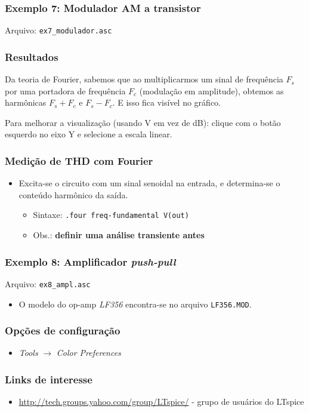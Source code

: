 \documentclass{beamer}
\begin{document}
\begin{frame}
\frametitle{Exemplo 7: Modulador AM a transistor}
Arquivo: \texttt{ex7\_modulador.asc}
\end{frame}

\begin{frame}
\frametitle{Resultados}
Da teoria de Fourier, sabemos que ao multiplicarmos um sinal de frequência $F_s$ por uma portadora de frequência $F_c$ (modulação em amplitude), obtemos as harmônicas $F_s + F_c$ e $F_s - F_c$. E isso fica visível no gráfico.

Para melhorar a visualização (usando V em vez de dB): clique com o botão esquerdo no eixo Y e selecione a escala linear.
\end{frame}

\begin{frame}
\frametitle{Medição de THD com Fourier}
\begin{itemize}
\item Excita-se o circuito com um sinal senoidal na entrada, e determina-se o conteúdo harmônico da saída.
\begin{itemize}
\item Sintaxe: \texttt{.four freq-fundamental V(out)}
\item Obs.: \textbf{definir uma análise transiente antes}
\end{itemize}
\end{itemize}
\end{frame}

\begin{frame}
\frametitle{Exemplo 8: Amplificador \textit{push-pull}}
Arquivo: \texttt{ex8\_ampl.asc}
\begin{itemize}
\item O modelo do op-amp \textit{LF356} encontra-se no arquivo \texttt{LF356.MOD}.
\end{itemize}
\end{frame}

\begin{frame}
\frametitle{Opções de configuração}
\begin{itemize}
\item \textit{Tools} $\rightarrow$ \textit{Color Preferences}
\end{itemize}
\end{frame}

\begin{frame}
\frametitle{Links de interesse}
\begin{itemize}
\item \url{http://tech.groups.yahoo.com/group/LTspice/} - grupo de usuários do LTspice
\end{itemize}
\end{frame}
\end{document}
